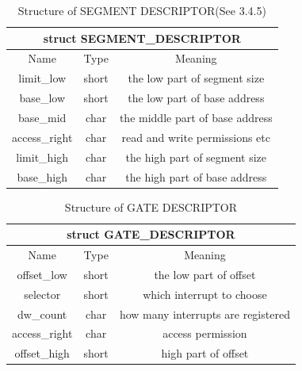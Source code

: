 \documentclass{swfcthesis}
\begin{document}
\begin{table}[!htbp]
  \centering
  \begin{tabular}[c]{|c|c|c|}
    \hline
    \multicolumn{3}{|c|}{struct SEGMENT\_DESCRIPTOR} \\
    \hline
    Name & Type & Meaning \\
    \hline
    limit\_low & short & the low part of segment size \\
    \hline
    base\_low & short & the low part of base address \\
    \hline
    base\_mid & char & the middle part of base address \\
    \hline
    access\_right & char & read and write permissions etc \\
    \hline
    limit\_high & char & the high part of segment size \\
    \hline
    base\_high & char & the high part of base address \\
    \hline
  \end{tabular}
  \caption{Structure of SEGMENT DESCRIPTOR(See 3.4.5\cite{intel_3a})}
  \label{tab:SEGMENT-DESCRIPTOR}
\end{table}

\begin{table}[!htbp]
  \centering
  \begin{tabular}[c]{|c|c|c|}
    \hline
    \multicolumn{3}{|c|}{struct GATE\_DESCRIPTOR} \\
    \hline
    Name & Type & Meaning \\
    \hline
    offset\_low & short & the low part of offset \\
    \hline
    selector & short & which interrupt to choose \\
    \hline
    dw\_count & char & how many interrupts are registered \\
    \hline
    access\_right & char & access permission \\
    \hline
    offset\_high & short & high part of offset \\
    \hline
    
  \end{tabular}
  \caption{Structure of GATE DESCRIPTOR}
  \label{tab:GATE-DESCRIPTOR}
\end{table}
\end{document}
